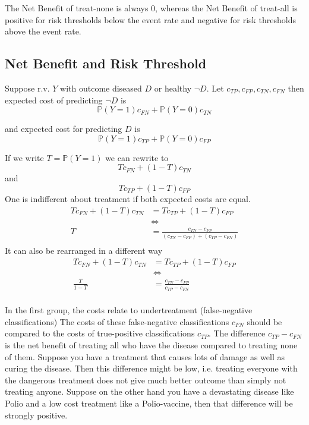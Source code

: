 	The Net Benefit of treat-none is always 0, 
	whereas the Net Benefit of treat-all is positive for risk thresholds below the event rate and negative for risk thresholds above the event rate.
	
	
\subsection{Net Benefit and Risk Threshold}
	Suppose r.v. $Y$ with outcome diseased $D$ or healthy $\neg D$.
	Let $c_{TP}, c_{FP}, c_{TN}, c_{FN}$ then expected cost of predicting $\neg D$ is
	\[
		\mathbb{P}(Y = 1) c_{FN} + \mathbb{P}(Y = 0) c_{TN}
	\]
	
	and expected cost for predicting $D$ is
	\[
		\mathbb{P}(Y = 1) c_{TP} + \mathbb{P}(Y = 0) c_{FP}
	\]
	
	If we write $T = \mathbb{P}(Y = 1)$ we can rewrite to
	\[
		T c_{FN} + (1-T) c_{TN}
	\]
	and
	\[
		T c_{TP} + (1-T) c_{FP}
	\]
	One is indifferent about treatment if both expected costs are equal.
	\[
	\begin{aligned}
		T c_{FN} + (1-T) c_{TN} &= T c_{TP} + (1-T) c_{FP} \\
		&\Leftrightarrow \\
		T &= \frac{c_{TN} - c_{FP}}{(c_{TN} - c_{FP}) + (c_{TP} - c_{FN})} \\
	\end{aligned}
	\]
	It can also be rearranged in a different way
	\[
	\begin{aligned}
		T c_{FN} + (1-T) c_{TN} &= T c_{TP} + (1-T) c_{FP} \\
		&\Leftrightarrow \\
		\frac{T}{1 - T} &= \frac{ c_{TN} - c_{FP} }{ c_{TP} - c_{FN} } \\
	\end{aligned}
	\]
	
	In the first group, the costs relate to undertreatment (false-negative classifications)
	The costs of these false-negative classifications $c_{FN}$ should be compared to the costs of true-positive classifications $c_{TP}$.
	The difference $c_{TP} - c_{FN}$ is the net benefit of treating all who have the disease compared to treating none of them.
	Suppose you have a treatment that causes lots of damage as well as curing the disease. 
	Then this difference might be low, i.e. treating everyone with the dangerous treatment does not give much better outcome than simply not treating anyone.
	Suppose on the other hand you have a devastating disease like Polio and a low cost treatment like a Polio-vaccine, then that difference will be strongly positive.
	
